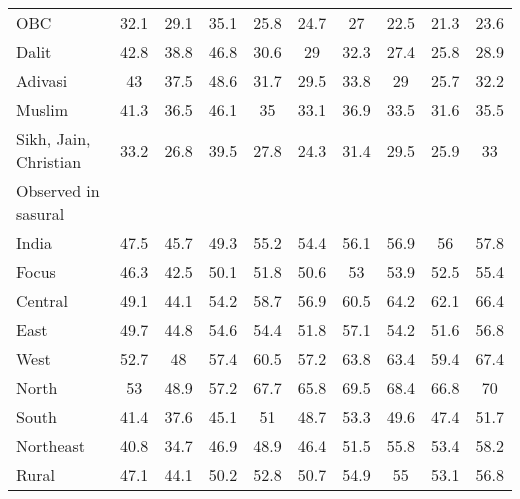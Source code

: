 \begin{tabular}{l*{9}{c}}
OBC                 &        32.1&        29.1&        35.1&        25.8&        24.7&          27&        22.5&        21.3&        23.6\\
Dalit               &        42.8&        38.8&        46.8&        30.6&          29&        32.3&        27.4&        25.8&        28.9\\
Adivasi             &          43&        37.5&        48.6&        31.7&        29.5&        33.8&          29&        25.7&        32.2\\
Muslim              &        41.3&        36.5&        46.1&          35&        33.1&        36.9&        33.5&        31.6&        35.5\\
Sikh, Jain, Christian&        33.2&        26.8&        39.5&        27.8&        24.3&        31.4&        29.5&        25.9&          33\\
\midrule
Observed in sasural &            &            &            &            &            &            &            &            &            \\
India               &        47.5&        45.7&        49.3&        55.2&        54.4&        56.1&        56.9&          56&        57.8\\
Focus               &        46.3&        42.5&        50.1&        51.8&        50.6&          53&        53.9&        52.5&        55.4\\
Central             &        49.1&        44.1&        54.2&        58.7&        56.9&        60.5&        64.2&        62.1&        66.4\\
East                &        49.7&        44.8&        54.6&        54.4&        51.8&        57.1&        54.2&        51.6&        56.8\\
West                &        52.7&          48&        57.4&        60.5&        57.2&        63.8&        63.4&        59.4&        67.4\\
North               &          53&        48.9&        57.2&        67.7&        65.8&        69.5&        68.4&        66.8&          70\\
South               &        41.4&        37.6&        45.1&          51&        48.7&        53.3&        49.6&        47.4&        51.7\\
Northeast           &        40.8&        34.7&        46.9&        48.9&        46.4&        51.5&        55.8&        53.4&        58.2\\
Rural               &        47.1&        44.1&        50.2&        52.8&        50.7&        54.9&          55&        53.1&        56.8\\

\end{tabular}
